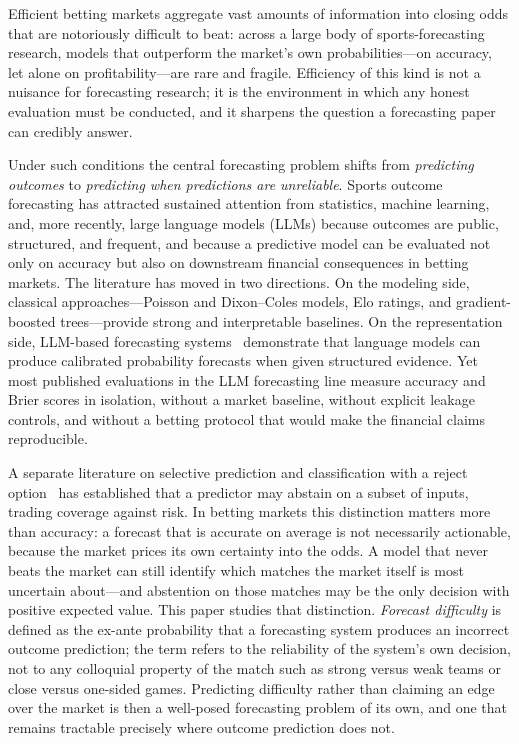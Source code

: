 Efficient betting markets aggregate vast amounts of information into
closing odds that are notoriously difficult to beat: across a large
body of sports-forecasting research, models that outperform the
market's own probabilities---on accuracy, let alone on
profitability---are rare and fragile. Efficiency of this kind is not
a nuisance for forecasting research; it is the environment in which
any honest evaluation must be conducted, and it sharpens the
question a forecasting paper can credibly answer.

Under such conditions the central forecasting problem shifts from
\emph{predicting outcomes} to \emph{predicting when predictions are
unreliable}. Sports outcome forecasting has attracted
sustained attention from statistics, machine learning, and, more
recently, large language models (LLMs) because outcomes are public,
structured, and frequent, and because a predictive model can be
evaluated not only on accuracy but also on downstream financial
consequences in betting markets. The literature has moved in two
directions. On the modeling side, classical approaches---Poisson and
Dixon--Coles models, Elo ratings, and gradient-boosted
trees---provide strong and interpretable baselines. On the
representation side, LLM-based forecasting
systems~\citep{halawi2024approaching, alur2025aia, yang2025llm}
demonstrate that language models can produce calibrated probability
forecasts when given structured evidence. Yet most published
evaluations in the LLM forecasting line measure accuracy and Brier
scores in isolation, without a market baseline, without explicit
leakage controls, and without a betting protocol that would make the
financial claims reproducible.

A separate literature on selective prediction and classification
with a reject option~\citep{chow1970optimum, geifman2017selective}
has established that a predictor may abstain on a subset of inputs,
trading coverage against risk. In betting markets this distinction
matters more than accuracy: a forecast that is accurate on average is
not necessarily actionable, because the market prices its own
certainty into the odds. A model that never beats the market can
still identify which matches the market itself is most uncertain
about---and abstention on those matches may be the only decision
with positive expected value. This paper studies that distinction.
\emph{Forecast difficulty} is defined as the ex-ante probability that
a forecasting system produces an incorrect outcome prediction; the
term refers to the reliability of the system's own decision, not to
any colloquial property of the match such as strong versus weak
teams or close versus one-sided games. Predicting difficulty rather
than claiming an edge over the market is then a well-posed
forecasting problem of its own, and one that remains tractable
precisely where outcome prediction does not.

